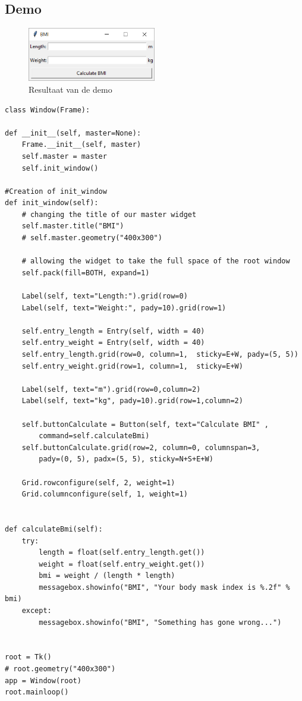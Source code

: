 \documentclass{article}
\begin{document}
\subsection{Demo}

\begin{figure}[H]
    \centering
    \includegraphics[width=0.5\textwidth]{tkinter-demo.png}
    \caption{Resultaat van de demo}
\end{figure}

\begin{verbatim}
class Window(Frame):

def __init__(self, master=None):
    Frame.__init__(self, master)
    self.master = master
    self.init_window()

#Creation of init_window
def init_window(self):
    # changing the title of our master widget
    self.master.title("BMI")
    # self.master.geometry("400x300")

    # allowing the widget to take the full space of the root window
    self.pack(fill=BOTH, expand=1)

    Label(self, text="Length:").grid(row=0)
    Label(self, text="Weight:", pady=10).grid(row=1)

    self.entry_length = Entry(self, width = 40)
    self.entry_weight = Entry(self, width = 40)
    self.entry_length.grid(row=0, column=1,  sticky=E+W, pady=(5, 5))
    self.entry_weight.grid(row=1, column=1,  sticky=E+W)

    Label(self, text="m").grid(row=0,column=2)
    Label(self, text="kg", pady=10).grid(row=1,column=2)

    self.buttonCalculate = Button(self, text="Calculate BMI" , 
        command=self.calculateBmi)
    self.buttonCalculate.grid(row=2, column=0, columnspan=3, 
        pady=(0, 5), padx=(5, 5), sticky=N+S+E+W)

    Grid.rowconfigure(self, 2, weight=1)
    Grid.columnconfigure(self, 1, weight=1)


def calculateBmi(self):
    try:
        length = float(self.entry_length.get())
        weight = float(self.entry_weight.get())
        bmi = weight / (length * length)
        messagebox.showinfo("BMI", "Your body mask index is %.2f" % bmi)
    except:
        messagebox.showinfo("BMI", "Something has gone wrong...")


root = Tk()
# root.geometry("400x300")
app = Window(root)
root.mainloop()
\end{verbatim}
\end{document}
